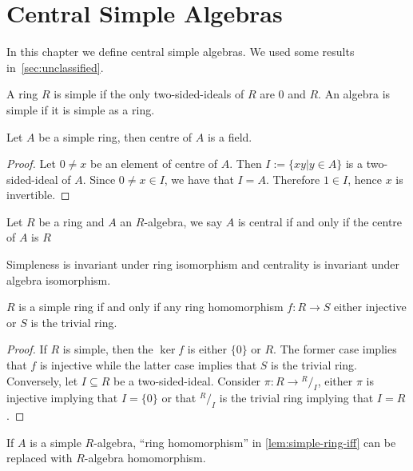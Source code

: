 \chapter{Central Simple Algebras}\label{sec:csa}

In this chapter we define central simple algebras. We used some results
in~\cref{sec:unclassified}.

\begin{definition} A ring $R$ is simple if the only
  two-sided-ideals of $R$ are ${0}$ and $R$. An algebra is simple if it is
  simple as a ring. \leanok {}
\end{definition}

\begin{lemma}
  \label{lem:center-simple-ring}
  Let $A$ be a simple ring, then centre of $A$ is a field. \leanok
\end{lemma}
\begin{proof}
  Let $0\ne x$ be an element of centre of $A$. Then $I := \{xy | y\in A\}$ is a
  two-sided-ideal of $A$. Since $0\ne x\in I$, we have that $I = A$. Therefore
  $1 \in I$, hence $x$ is invertible.
\end{proof}

\begin{definition}
  Let $R$ be a ring and $A$ an $R$-algebra, we say $A$ is central if and only if
  the centre of $A$ is $R$ \leanok {}
\end{definition}

\begin{remark}
  Simpleness is invariant under ring isomorphism and centrality is invariant
  under algebra isomorphism.
\end{remark}

\begin{lemma}\label{lem:simple-ring-iff}
  $R$ is a simple ring if and only if any ring homomorphism $f : R \to S$ either
  injective or $S$ is the trivial ring. \leanok
\end{lemma}
\begin{proof}
  If $R$ is simple, then the $\ker f$ is either $\{0\}$ or $R$. The former case
  implies that $f$ is injective while the latter case implies that $S$ is the
  trivial ring. Conversely, let $I\subseteq R$ be a two-sided-ideal. Consider
  $\pi: R \to {}^{R}/_{I}$, either $\pi$ is injective implying that $I = \{0\}$
  or that ${}^{R}/_{I}$ is the trivial ring implying that $I = R$.
\end{proof}
\begin{remark}
  If $A$ is a simple $R$-algebra, ``ring homomorphism'' in \cref{lem:simple-ring-iff} can be replaced with $R$-algebra homomorphism.
\end{remark}

